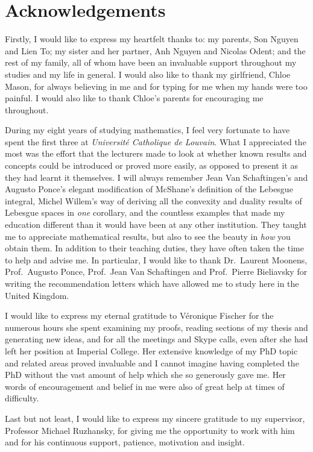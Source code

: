 \chapter*{Acknowledgements}

Firstly, I would like to express my heartfelt thanks to:
my parents, Son Nguyen and Lien To; my sister and her partner, Anh Nguyen and Nicolas Odent; and the rest of my family,
all of whom have been an invaluable support throughout my studies and my life in general.
I would also like to thank my girlfriend, Chloe Mason,
for always believing in me and for typing for me when my hands were too painful.
I would also like to thank Chloe's parents for encouraging me throughout.

During my eight years of studying mathematics,
I feel very fortunate to have spent the first three at \emph{Universit\'e Catholique de Louvain}.
What I appreciated the most was the effort that the lecturers made to look at
whether known results and concepts could be introduced or proved more easily,
as opposed to present it as they had learnt it themselves.
I will always remember Jean Van Schaftingen's and Augusto Ponce's elegant modification of McShane's definition of the Lebesgue integral,
Michel Willem's way of deriving all the convexity and duality results of Lebesgue spaces in \emph{one} corollary,
and the countless examples that made my education different than it would have been at any other institution.
They taught me to appreciate mathematical results,
but also to see the beauty in \emph{how} you obtain them.
In addition to their teaching duties,
they have often taken the time to help and advise me.
In particular,
I would like to thank Dr.\ Laurent Moonens,
Prof.\ Augusto Ponce, Prof.\ Jean Van Schaftingen and Prof.\ Pierre Bieliavsky for writing the recommendation letters which have allowed me to study here in the United Kingdom.

I would like to express my eternal gratitude to V\'eronique Fischer for the numerous hours she spent examining my proofs,
reading sections of my thesis and generating new ideas,
and for all the meetings and Skype calls,
even after she had left her position at Imperial College.
Her extensive knowledge of my PhD topic and related areas proved invaluable and
I cannot imagine having completed the PhD without the vast amount of help which she so generously gave me.
Her words of encouragement and belief in me were also of great help at times of difficulty.

Last but not least,
I would like to express my sincere gratitude to my supervisor,
Professor Michael Ruzhansky,
for giving me the opportunity to work with him and for his continuous support, patience, motivation and insight.
